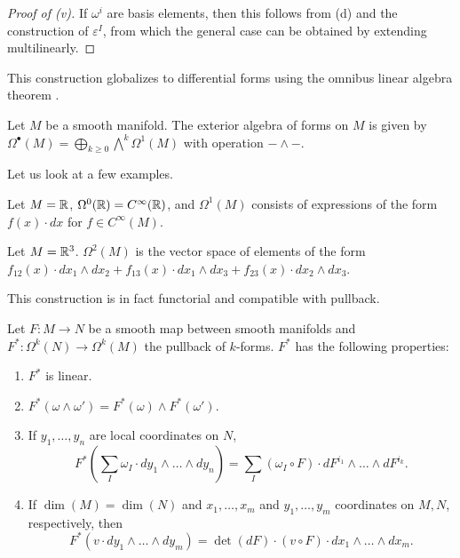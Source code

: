 \begin{proof}[Proof of (v)]
    If $\omega^{i}$ are basis elements, then this follows from (d) and the construction of $\varepsilon^{I}$, from which the general case can be obtained by extending multilinearly. 
\end{proof}
This construction globalizes to differential forms using the omnibus linear algebra theorem . 
\begin{definition}\label{def: algebra of forms}
    Let $M$ be a smooth manifold. The exterior algebra of forms on $M$ is given by $\Omega^{\bullet}(M)=\bigoplus_{k\geq0}\bigwedge^{k}\Omega^{1}(M)$ with operation $-\wedge-$.  
\end{definition}
Let us look at a few examples. 
\begin{example}
    Let $M=\mathbb{R}$, $\Omega^{0}(\mathbb{R})=C^{\infty}(\mathbb{R})$, and $\Omega^{1}(M)$ consists of expressions of the form $f(x)\cdot dx$ for $f\in C^{\infty}(M)$. 
\end{example}
\begin{example}
    Let $M=\mathbb{R}^{3}$. $\Omega^{2}(M)$ is the vector space of elements of the form $f_{12}(x)\cdot dx_{1}\wedge dx_{2}+f_{13}(x)\cdot dx_{1}\wedge dx_{3}+f_{23}(x)\cdot dx_{2}\wedge dx_{3}$. 
\end{example}
This construction is in fact functorial and compatible with pullback. 
\begin{proposition}\label{prop: functoriality of forms}
    Let $F:M\to N$ be a smooth map between smooth manifolds and $F^{*}:\Omega^{k}(N)\to\Omega^{k}(M)$ the pullback of $k$-forms. $F^{*}$ has the following properties:
    \begin{enumerate}[label=(\roman*)]
        \item $F^{*}$ is linear. 
        \item $F^{*}(\omega\wedge\omega')=F^{*}(\omega)\wedge F^{*}(\omega')$. 
        \item If $y_{1},\dots,y_{n}$ are local coordinates on $N$, 
        $$F^{*}\left(\sum_{I}\omega_{I}\cdot dy_{1}\wedge\dots\wedge dy_{n}\right)=\sum_{I}(\omega_{I}\circ F)\cdot dF^{i_{1}}\wedge\dots\wedge dF^{i_{k}}.$$
        \item If $\dim(M)=\dim(N)$ and $x_{1},\dots,x_{m}$ and $y_{1},\dots,y_{m}$ coordinates on $M,N$, respectively, then 
        $$F^{*}(v\cdot dy_{1}\wedge\dots\wedge dy_{m})=\det(dF)\cdot(v\circ F)\cdot dx_{1}\wedge\dots\wedge dx_{m}.$$
    \end{enumerate}
\end{proposition}
